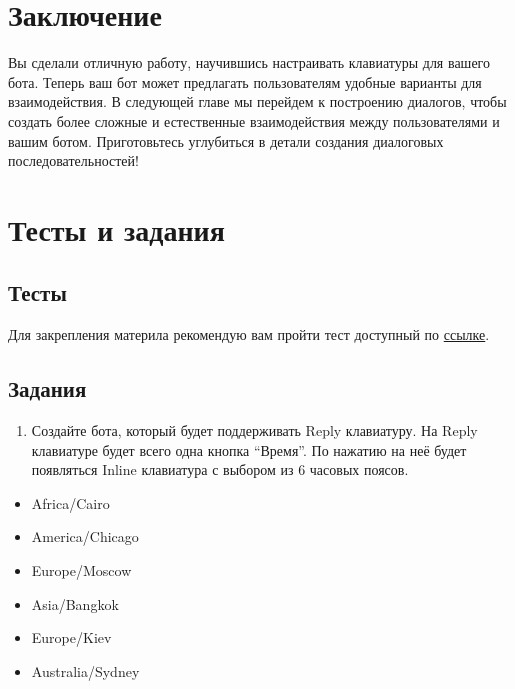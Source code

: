 \documentclass[
]{book}
\providecommand{\tightlist}{%
  \setlength{\itemsep}{0pt}\setlength{\parskip}{0pt}}
\begin{document}
\section{Заключение}\label{ux437ux430ux43aux43bux44eux447ux435ux43dux438ux435-2}

Вы сделали отличную работу, научившись настраивать клавиатуры для вашего бота. Теперь ваш бот может предлагать пользователям удобные варианты для взаимодействия. В следующей главе мы перейдем к построению диалогов, чтобы создать более сложные и естественные взаимодействия между пользователями и вашим ботом. Приготовьтесь углубиться в детали создания диалоговых последовательностей!

\section{Тесты и задания}\label{ux442ux435ux441ux442ux44b-ux438-ux437ux430ux434ux430ux43dux438ux44f-2}

\subsection{Тесты}\label{ux442ux435ux441ux442ux44b-2}

Для закрепления материла рекомендую вам пройти тест доступный по \href{https://onlinetestpad.com/t/build-tg-bot-in-r-3}{ссылке}.

\subsection{Задания}\label{ux437ux430ux434ux430ux43dux438ux44f-2}

\begin{enumerate}
\def\labelenumi{\arabic{enumi}.}
\tightlist
\item
  Создайте бота, который будет поддерживать Reply клавиатуру. На Reply клавиатуре будет всего одна кнопка ``Время''. По нажатию на неё будет появляться Inline клавиатура с выбором из 6 часовых поясов.
\end{enumerate}

\begin{itemize}
\tightlist
\item
  Africa/Cairo
\item
  America/Chicago
\item
  Europe/Moscow
\item
  Asia/Bangkok
\item
  Europe/Kiev
\item
  Australia/Sydney
\end{itemize}
\end{document}
